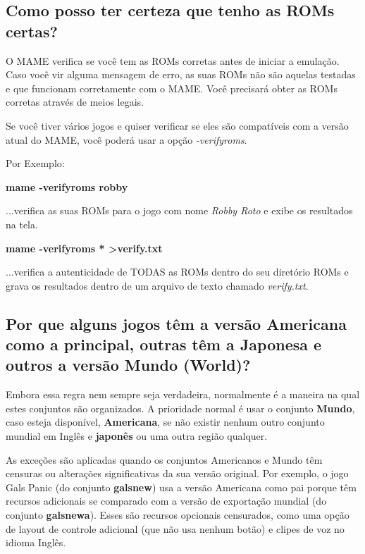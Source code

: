 \documentclass[letterpaper,10pt,brazil]{sphinxmanual}
\begin{document}
\subsection{Como posso ter certeza que tenho as ROMs certas?}
\label{usingmame/commonissues:como-posso-ter-certeza-que-tenho-as-roms-certas}\label{usingmame/commonissues:rom-verify}
O MAME verifica se você tem as ROMs corretas antes de iniciar a
emulação. Caso você vir alguma mensagem de erro, as suas ROMs não são
aquelas testadas e que funcionam corretamente com o MAME. Você precisará
obter as ROMs corretas através de meios legais.

Se você tiver vários jogos e quiser verificar se eles são compatíveis
com a versão atual do MAME, você poderá usar a opção \emph{-verifyroms}.

\begin{DUlineblock}{0em}
\item[] Por Exemplo:
\item[] \textbf{mame -verifyroms robby}
\item[] ...verifica as suas ROMs para o jogo com nome \emph{Robby Roto} e exibe os resultados na tela.
\end{DUlineblock}

\begin{DUlineblock}{0em}
\item[] \textbf{mame -verifyroms * \textgreater{}verify.txt}
\item[] ...verifica a autenticidade de TODAS as ROMs dentro do seu diretório ROMs e grava os resultados dentro de um arquivo de texto chamado \emph{verify.txt}.
\end{DUlineblock}


\subsection{Por que alguns jogos têm a versão Americana como a principal, outras têm a Japonesa e outros a versão  Mundo (World)?}
\label{usingmame/commonissues:por-que-alguns-jogos-tem-a-versao-americana-como-a-principal-outras-tem-a-japonesa-e-outros-a-versao-mundo-world}\label{usingmame/commonissues:parent-sets}
Embora essa regra nem sempre seja verdadeira, normalmente é a maneira na
qual estes conjuntos são organizados. A prioridade normal é usar o
conjunto \textbf{Mundo}, caso esteja disponível, \textbf{Americana}, se não
existir nenhum outro conjunto mundial em Inglês e \textbf{japonês} ou uma
outra região qualquer.

As exceções são aplicadas quando os conjuntos Americanos e Mundo têm
censuras ou alterações significativas da sua versão original.
Por exemplo, o jogo Gals Panic (do conjunto \textbf{galsnew}) usa a versão
Americana como pai porque têm recursos adicionais se comparado com a
versão de exportação mundial (do conjunto \textbf{galsnewa}). Esses são
recursos opcionais censurados, como uma opção de layout de controle
adicional (que não usa nenhum botão) e clipes de voz no idioma Inglês.
\end{document}
